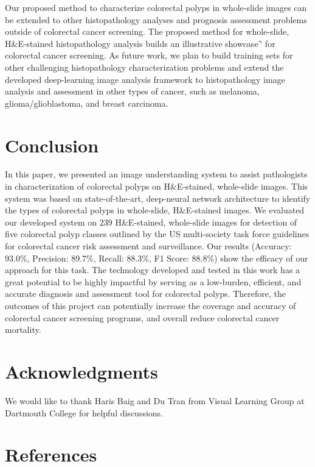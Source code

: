 \documentclass[review]{elsarticle}
\begin{document}
Our proposed method to characterize colorectal polyps in whole-slide images can be extended to other histopathology analyses and prognosis assessment problems outside of colorectal cancer screening. The proposed method for whole-slide, H\&E-stained histopathology analysis builds an illustrative showcase” for colorectal cancer screening. As future work, we plan to build training sets for other challenging histopathology characterization problems and extend the developed deep-learning image analysis framework to histopathology image analysis and assessment in other types of cancer, such as melanoma, glioma/glioblastoma, and breast carcinoma.



\section{Conclusion}\label{conclusion}
In this paper, we presented an image understanding system to assist pathologists in characterization of colorectal polyps on H\&E-stained, whole-slide images. This system was based on state-of-the-art, deep-neural network architecture to identify the types of colorectal polyps in whole-slide, H\&E-stained images. We evaluated our developed system on 239 H\&E-stained, whole-slide images for detection of five colorectal polyp classes outlined by the US multi-society task force guidelines for colorectal cancer risk assessment and surveillance. Our results (Accuracy: 93.0\%, Precision: 89.7\%, Recall: 88.3\%, F1 Score: 88.8\%) show the efficacy of our approach for this task. The technology developed and tested in this work has a great potential to be highly impactful by serving as a low-burden, efficient, and accurate diagnosis and assessment tool for colorectal polyps. Therefore, the outcomes of this project can potentially increase the coverage and accuracy of colorectal cancer screening programs, and overall reduce colorectal cancer mortality.


\section{Acknowledgments}
We would like to thank Haris Baig and Du Tran from Visual Learning Group at Dartmouth College for helpful discussions.


\section*{References}

\end{document}
